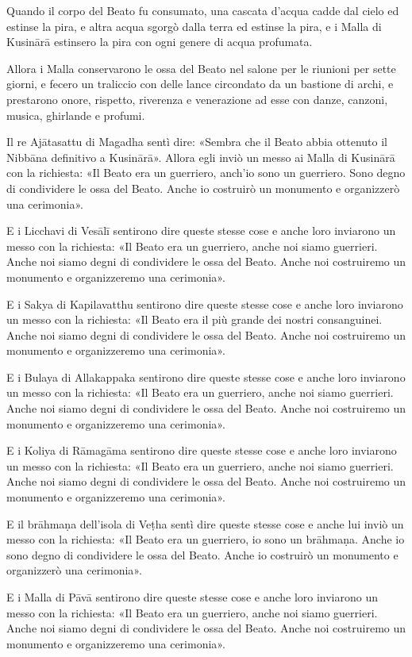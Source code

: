 Quando il corpo del Beato fu consumato, una cascata d’acqua cadde dal
cielo ed estinse la pira, e altra acqua sgorgò dalla terra ed estinse la
pira, e i Malla di Kusinārā estinsero la pira con ogni genere di acqua
profumata.


Allora i Malla conservarono le ossa del Beato nel salone per le riunioni
per sette giorni, e fecero un traliccio con delle lance circondato da un
bastione di archi, e prestarono onore, rispetto, riverenza e venerazione
ad esse con danze, canzoni, musica, ghirlande e profumi.


Il re Ajātasattu di Magadha sentì dire: «Sembra che il Beato abbia
ottenuto il Nibbāna definitivo a Kusinārā». Allora egli inviò un messo
ai Malla di Kusinārā con la richiesta: «Il Beato era un guerriero,
anch’io sono un guerriero. Sono degno di condividere le ossa del Beato.
Anche io costruirò un monumento e organizzerò una cerimonia».


E i Licchavi di Vesālī sentirono dire queste stesse cose e anche loro
inviarono un messo con la richiesta: «Il Beato era un guerriero, anche
noi siamo guerrieri. Anche noi siamo degni di condividere le ossa del
Beato. Anche noi costruiremo un monumento e organizzeremo una
cerimonia».


E i Sakya di Kapilavatthu sentirono dire queste stesse cose e anche loro
inviarono un messo con la richiesta: «Il Beato era il più grande dei
nostri consanguinei. Anche noi siamo degni di condividere le ossa del
Beato. Anche noi costruiremo un monumento e organizzeremo una
cerimonia».


E i Bulaya di Allakappaka sentirono dire queste stesse cose e anche loro
inviarono un messo con la richiesta: «Il Beato era un guerriero, anche
noi siamo guerrieri. Anche noi siamo degni di condividere le ossa del
Beato. Anche noi costruiremo un monumento e organizzeremo una
cerimonia».


E i Koliya di Rāmagāma sentirono dire queste stesse cose e anche loro
inviarono un messo con la richiesta: «Il Beato era un guerriero, anche
noi siamo guerrieri. Anche noi siamo degni di condividere le ossa del
Beato. Anche noi costruiremo un monumento e organizzeremo una
cerimonia».


E il brāhmaṇa dell’isola di Veṭha sentì dire queste stesse cose e anche
lui inviò un messo con la richiesta: «Il Beato era un guerriero, io sono
un brāhmaṇa. Anche io sono degno di condividere le ossa del Beato. Anche
io costruirò un monumento e organizzerò una cerimonia».


E i Malla di Pāvā sentirono dire queste stesse cose e anche loro
inviarono un messo con la richiesta: «Il Beato era un guerriero, anche
noi siamo guerrieri. Anche noi siamo degni di condividere le ossa del
Beato. Anche noi costruiremo un monumento e organizzeremo una
cerimonia».


